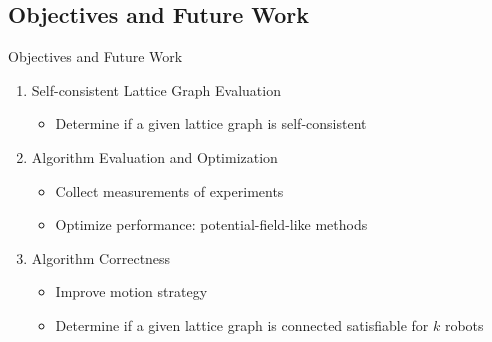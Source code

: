 \subsection[future]{Objectives and Future Work}
\begin{frame}{Objectives and Future Work}{}
  \begin{enumerate}
  \item Self-consistent Lattice Graph Evaluation
    \begin{itemize}
    \item Determine if a given lattice graph is self-consistent
    \end{itemize}
  \item Algorithm Evaluation and Optimization
    \begin{itemize}
    \item Collect measurements of experiments
    \item Optimize performance: potential-field-like methods
    \end{itemize}
  \item Algorithm Correctness
    \begin{itemize}
    \item Improve motion strategy
    \item Determine if a given lattice graph is connected satisfiable for $k$
      robots
    \end{itemize}
  \end{enumerate}
\end{frame}

